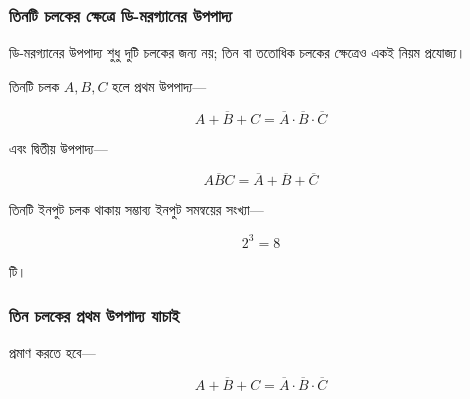 
\subsubsection*{তিনটি চলকের ক্ষেত্রে ডি-মরগ্যানের উপপাদ্য}

ডি-মরগ্যানের উপপাদ্য শুধু দুটি চলকের জন্য নয়;
তিন বা ততোধিক চলকের ক্ষেত্রেও একই নিয়ম প্রযোজ্য।

তিনটি চলক \(A,B,C\) হলে প্রথম উপপাদ্য—

\[
\boxed{
\overline{A+B+C}
=
\overline{A}\cdot
\overline{B}\cdot
\overline{C}
}
\]

এবং দ্বিতীয় উপপাদ্য—

\[
\boxed{
\overline{ABC}
=
\overline{A}+
\overline{B}+
\overline{C}
}
\]

তিনটি ইনপুট চলক থাকায় সম্ভাব্য ইনপুট সমন্বয়ের সংখ্যা—

\[
2^3=8
\]

টি।


\subsubsection*{তিন চলকের প্রথম উপপাদ্য যাচাই}

প্রমাণ করতে হবে—

\[
\overline{A+B+C}
=
\overline{A}\cdot
\overline{B}\cdot
\overline{C}
\]

\begin{center}
\scriptsize
{}
\end{center}

